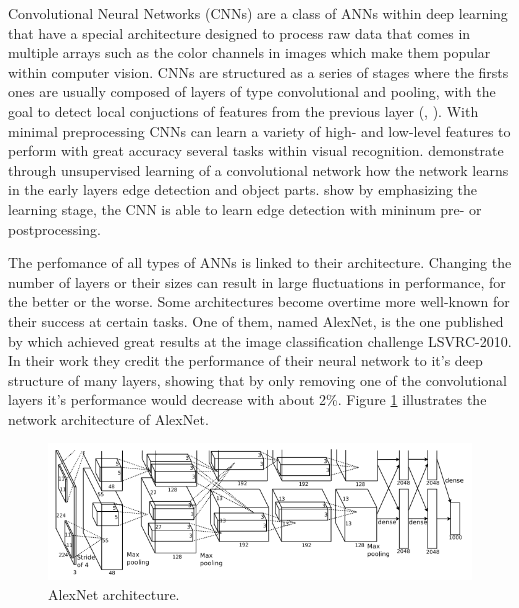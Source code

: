 Convolutional Neural Networks (CNNs) are a class of ANNs within deep learning that have a special architecture designed to process raw data that comes in multiple arrays such as the color channels in images which make them popular within computer vision. CNNs are structured as a series of stages where the firsts ones are usually composed of layers of type convolutional and pooling, with the goal to detect local conjuctions of features from the previous layer (\parencite{Lecun2015}, \parencite{Jarrett2009}). With minimal preprocessing CNNs can learn a variety of high- and low-level features to perform with great accuracy several tasks within visual recognition. \textcite{Lee2009} demonstrate through unsupervised learning of a convolutional network how the network learns in the early layers edge detection and object parts. \textcite{Turaga2010} show by emphasizing the learning stage, the CNN is able to learn edge detection with mininum pre- or postprocessing.

The perfomance of all types of ANNs is linked to their architecture. Changing the number of layers or their sizes can result in large fluctuations in performance, for the better or the worse. Some architectures become overtime more well-known for their success at certain tasks. One of them, named AlexNet, is the one published by \textcite{Krizhevsky2012} which achieved great results at the \textcite{ImageNet} image classification challenge LSVRC-2010. In their work they credit the performance of their neural network to it's deep structure of many layers, showing that by only removing one of the convolutional layers it's performance would decrease with about 2\%. Figure \ref{fig:alexnet_orig} illustrates the network architecture of AlexNet.

\begin{figure}
	\centering
	\includegraphics[width=\textwidth]{img/methods/alexnet_original.png}
	\caption{AlexNet architecture.}
	\label{fig:alexnet_orig}
\end{figure}

